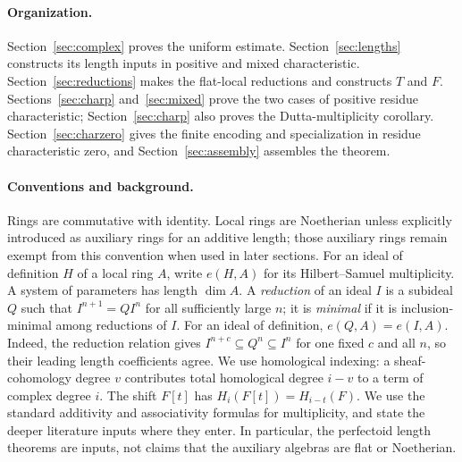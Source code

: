 \documentclass[11pt]{article}
\numberwithin{equation}{section}
\theoremstyle{definition}
\begin{document}
\paragraph{Organization.}
Section~\ref{sec:complex} proves the uniform estimate.
Section~\ref{sec:lengths} constructs its length inputs in positive
and mixed characteristic. Section~\ref{sec:reductions} makes the
flat-local reductions and constructs $T$ and $F$.
Sections~\ref{sec:charp} and~\ref{sec:mixed} prove the two cases of
positive residue characteristic; Section~\ref{sec:charp} also proves
the Dutta-multiplicity corollary. Section~\ref{sec:charzero} gives
the finite encoding and specialization in residue characteristic
zero, and Section~\ref{sec:assembly} assembles the theorem.

\paragraph{Conventions and background.}
Rings are commutative with identity. Local rings are Noetherian
unless explicitly introduced as auxiliary rings for an additive
length; those auxiliary rings remain exempt from this convention
when used in later sections. For an ideal of definition $H$ of a local ring $A$, write
$e(H,A)$ for its Hilbert--Samuel multiplicity. A system of parameters
has length $\dim A$. A \emph{reduction} of an ideal $I$ is a subideal
$Q$ such that $I^{n+1}=QI^n$ for all sufficiently large $n$; it is
\emph{minimal} if it is inclusion-minimal among reductions of $I$.
For an ideal of definition, $e(Q,A)=e(I,A)$. Indeed, the reduction
relation gives $I^{n+c}\subseteq Q^n\subseteq I^n$ for one fixed
$c$ and all $n$, so their leading length coefficients agree.
We use homological indexing: a sheaf-cohomology
degree $v$ contributes total homological degree $i-v$ to a term of
complex degree $i$. The shift $F[t]$ has $H_i(F[t])=H_{i-t}(F)$.
We use the standard additivity and associativity formulas for
multiplicity, and state the deeper literature inputs where they enter.
In particular, the perfectoid length theorems are inputs, not claims
that the auxiliary algebras are flat or Noetherian.







\end{document}
